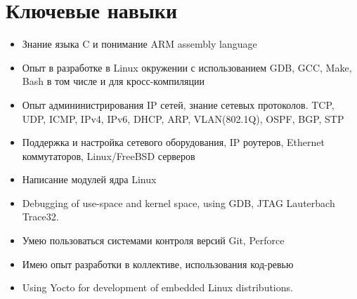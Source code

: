 \documentclass[11pt,a4paper]{moderncv}
\title{\ml{Resume}{Резюме}}
\newif\ifenglish
\newcommand{\ml}[2]{\ifenglish#1\else#2\fi}
\begin{document}
\makecvtitle
\setlength{\hintscolumnwidth}{0.20\textwidth}

\def \YAR {\ml{Yaroslavl, Russia}{г. Ярославль}}
\def \MSK {\ml{Moscow}{Москва}}
\def \UNIV {\ml{Yaroslavl State University}{ЯРгУ им. П.Г. Демидова}}
\def \Samsung {\ml{Samsung R\&D Russia}{Исследовательский центр самсунг}}
\def \Samsunglogo {\\\texttt{[image: samsung.png]}}
\def \OpSy {OpenSynergy GmbH}
\def \BER {Berlin, Germany}

\section{\ml{Professional skills}{Ключевые навыки}}
\begin{itemize}
\item \ml{Expertise with C language and understanding of ARM assembly language}{Знание языка C и понимание ARM assembly language}
\item \ml{Development in Linux environment i.e. experience with GCC, Make, Bash, cross compilation}{Опыт в разработке в Linux окружении с использованием GDB, GCC, Make, Bash в том числе и для кросс-компиляции}
\item \ml{General knowledge about IP networks and transport layer protocols}{Опыт админинистрирования IP сетей, знание сетевых протоколов. } TCP, UDP, ICMP, IPv4, IPv6, DHCP, ARP, VLAN(802.1Q), OSPF, BGP, STP
\item \ml{Maintaining and configuring network equipment, IP routers, Ethernet switches, Linux/FreeBSD servers}{Поддержка и настройка сетевого оборудования, IP роутеров, Ethernet коммутаторов, Linux/FreeBSD серверов}
\item \ml{Driver development for Linux kernel}{Написание модулей ядра Linux}
\item Debugging of use-space and kernel space, using GDB, JTAG Lauterbach Trace32.
\item \ml{Experience with version control systems Git, Perforce}{Умею пользоваться системами контроля версий Git, Perforce}
\item \ml{Working in a big distributed team, use of code review systems like Gerrit and Helix SWARM}{Имею опыт разработки в коллективе, использования код-ревью}
\item Using Yocto for development of embedded Linux distributions.
\end{itemize}

\ml{My interests lies in the following areas: System design, SW architecture, SW development, Research}{}
\end{document}

